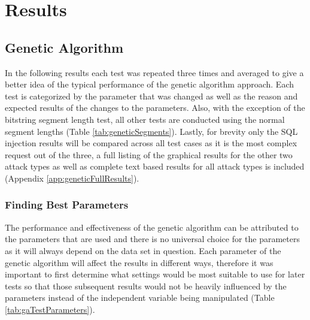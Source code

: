 \chapter{Results} 

\section{Genetic Algorithm}

In the following results each test was repeated three times and averaged to give a better idea of the typical performance of the genetic algorithm approach.  Each test is categorized by the parameter that was changed as well as the reason and expected results of the changes to the parameters.  Also, with the exception of the bitstring segment length test, all other tests are conducted using the normal segment lengths (Table \ref{tab:geneticSegments}).  Lastly, for brevity only the SQL injection results will be compared across all test cases as it is the most complex request out of the three, a full listing of the graphical results for the other two attack types as well as complete text based results for all attack types is included (Appendix \ref{app:geneticFullResults}).

\subsection{Finding Best Parameters}

The performance and effectiveness of the genetic algorithm can be attributed to the parameters that are used and there is no universal choice for the parameters as it will always depend on the data set in question.\cite{optimalPopulationGenetic}  Each parameter of the genetic algorithm will affect the results in different ways, therefore it was important to first determine what settings would be most suitable to use for later tests so that those subsequent results would not be heavily influenced by the parameters instead of the independent variable being manipulated (Table \ref{tab:gaTestParameters}).  

